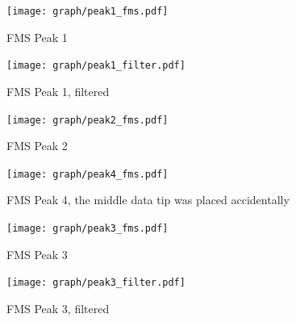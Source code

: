 \begin{figure}[p]
	\centering
	\texttt{[image: graph/peak1\_fms.pdf]}
	\vspace{-2ex}
	\caption{FMS Peak 1}
	\label{fig:P1_fms}
	\vspace{2ex}

	\texttt{[image: graph/peak1\_filter.pdf]}
	\vspace{-2ex}
	\caption{FMS Peak 1, filtered}
	\label{fig:P1_filter}
	\vspace{-2em}
\end{figure}

\begin{figure}[p]
	\centering
	\texttt{[image: graph/peak2\_fms.pdf]}
	\vspace{-2ex}
	\caption{FMS Peak 2}
	\label{fig:P2_fms}
	\vspace{2ex}

	\texttt{[image: graph/peak4\_fms.pdf]}
	\vspace{-2ex}
	\caption{FMS Peak 4, the middle data tip was placed accidentally}
	\label{fig:P4_fms}
	\vspace{-2em}
\end{figure}

\begin{figure}[p]
	\centering
	\texttt{[image: graph/peak3\_fms.pdf]}
	\vspace{-2ex}
	\caption{FMS Peak 3}
	\label{fig:P3_fms}
	\vspace{2ex}

	\texttt{[image: graph/peak3\_filter.pdf]}
	\vspace{-2ex}
	\caption{FMS Peak 3, filtered}
	\label{fig:P3_filter}
	\vspace{-2em}
\end{figure}

